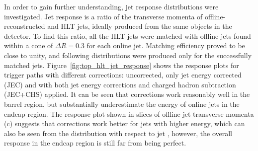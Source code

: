 In order to gain further understanding, jet response distributions were investigated. Jet response is a ratio of the
transverse momenta of offline-reconstructed and HLT jets, ideally produced from the same objects in the detector. To
find this ratio, all the HLT jets were matched with offline jets found within a cone of $\Delta R = 0.3$ for each online
jet. Matching efficiency proved to be close to unity, and following distributions were produced only for the
successfully matched jets. Figure~\ref{fig:top_hlt_jet_response} shows the response plots for trigger paths with
different corrections: uncorrected, only jet energy corrected (JEC) and with both jet energy corrections and charged
hadron subtraction (JEC+CHS) applied. It can be seen that corrections work reasonably well in the barrel region, but
substantially underestimate the energy of online jets in the endcap region. The response plot shown in slices of offline
jet transverse momenta (c) suggests that corrections work better for jets with higher energy, which can also be seen
from the distribution with respect to jet \pt, however, the overall response in the endcap region is still far from
being perfect.

